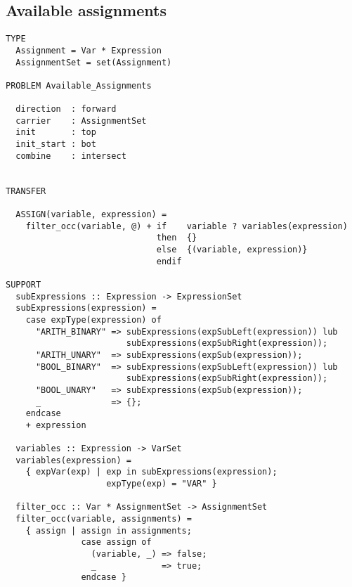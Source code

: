 \documentclass[a4paper]{article}
\begin{document}
  \subsection{Available assignments}
  \begin{verbatim}
TYPE
  Assignment = Var * Expression
  AssignmentSet = set(Assignment)

PROBLEM Available_Assignments

  direction  : forward
  carrier    : AssignmentSet
  init       : top
  init_start : bot
  combine    : intersect


TRANSFER

  ASSIGN(variable, expression) =
    filter_occ(variable, @) + if    variable ? variables(expression)
                              then  {}
                              else  {(variable, expression)}
                              endif

SUPPORT
  subExpressions :: Expression -> ExpressionSet
  subExpressions(expression) =
    case expType(expression) of
      "ARITH_BINARY" => subExpressions(expSubLeft(expression)) lub
                        subExpressions(expSubRight(expression));
      "ARITH_UNARY"  => subExpressions(expSub(expression));
      "BOOL_BINARY"  => subExpressions(expSubLeft(expression)) lub 
                        subExpressions(expSubRight(expression));
      "BOOL_UNARY"   => subExpressions(expSub(expression));
      _              => {};
    endcase
    + expression
     
  variables :: Expression -> VarSet
  variables(expression) = 
    { expVar(exp) | exp in subExpressions(expression);
                    expType(exp) = "VAR" }

  filter_occ :: Var * AssignmentSet -> AssignmentSet
  filter_occ(variable, assignments) =
    { assign | assign in assignments;
               case assign of
                 (variable, _) => false;
                 _             => true;
               endcase }

  \end{verbatim}
\end{document}
